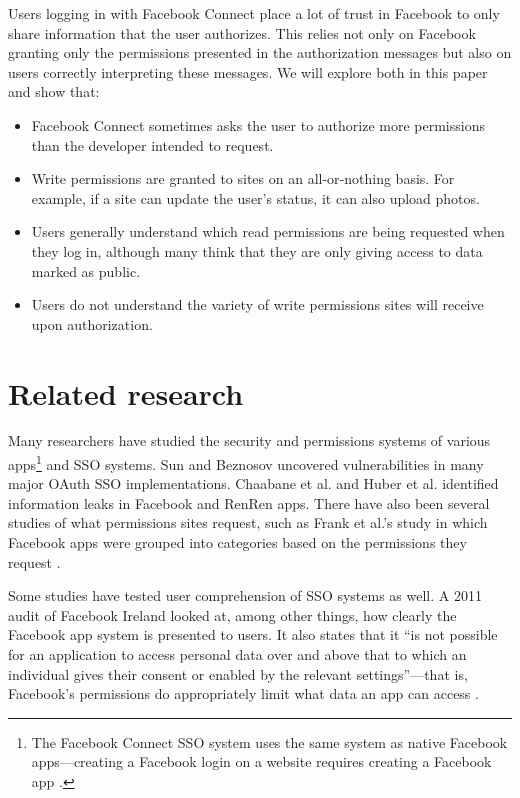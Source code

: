 \documentclass[10pt]{sig-alternate-10pt}
\begin{document}
Users logging in with Facebook Connect place a lot of trust in Facebook to only share information that the user authorizes. This relies not only on Facebook granting only the permissions presented in the authorization messages but also on users correctly interpreting these messages. We will explore both in this paper and show that:

\begin{itemize}
  \item Facebook Connect sometimes asks the user to authorize more permissions than the developer intended to request.
  \item Write permissions are granted to sites on an all-or-nothing basis. For example, if a site can update the user's status, it can also upload photos.
  \item Users generally understand which read permissions are being requested when they log in, although many think that they are only giving access to data marked as public.
  \item Users do not understand the variety of write permissions sites will receive upon authorization.
\end{itemize}


\section{Related research}
\label{sec:research}

Many researchers have studied the security and permissions systems of various apps\footnote{The Facebook Connect SSO system uses the same system as native Facebook apps---creating a Facebook login on a website requires creating a Facebook app \cite{fbexample}.} and SSO systems. Sun and Beznosov \cite{devildetails} uncovered vulnerabilities in many major OAuth SSO implementations. Chaabane et al. \cite{chaabane} and Huber et al. \cite{appinspect} identified information leaks in Facebook and RenRen apps. There have also been several studies of what permissions sites request, such as Frank et al.'s study in which Facebook apps were grouped into categories based on the permissions they request \cite{miningpermissions}.

Some studies have tested user comprehension of SSO systems as well. A 2011 audit of Facebook Ireland looked at, among other things, how clearly the Facebook app system is presented to users. It also states that it ``is not possible for an application to access personal data over and above that to which an individual gives their consent or enabled by the relevant settings''---that is, Facebook's permissions do appropriately limit what data an app can access \cite{irishaudit}.
\end{document}
